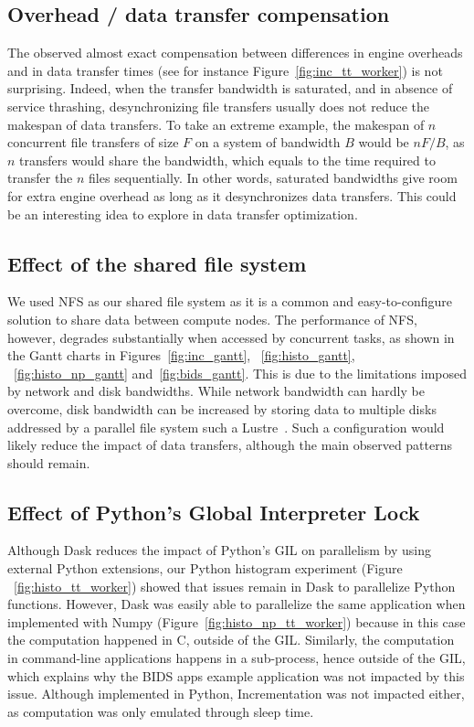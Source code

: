 \documentclass[conference]{IEEEtran}
\begin{document}
\subsection{Overhead / data transfer compensation}

The observed almost exact compensation between differences in engine
overheads and in data transfer times (see for instance
Figure~\ref{fig:inc_tt_worker}) is not surprising. Indeed, when the transfer
bandwidth is saturated, and in absence of service thrashing,
desynchronizing file transfers usually does not reduce the makespan of data
transfers. To take an extreme example, the makespan of $n$ concurrent file
transfers of size $F$ on a system of bandwidth $B$ would be $nF/B$, as $n$
transfers would share the bandwidth, which equals to the time required
to transfer the $n$ files sequentially. In other words, saturated bandwidths
give room for extra engine overhead as long as it desynchronizes data
transfers. This could be an interesting idea to explore in data transfer optimization.

\subsection{Effect of the shared file system}

We used NFS as our shared file system as it is a common and
easy-to-configure solution to share data between compute nodes. The
performance of NFS, however, degrades substantially when accessed by
concurrent tasks, as shown in the Gantt charts in
Figures~\ref{fig:inc_gantt}, ~\ref{fig:histo_gantt}, ~\ref{fig:histo_np_gantt} 
and~\ref{fig:bids_gantt}. This is due to the limitations imposed by network and disk
bandwidths. While network bandwidth can hardly be overcome, disk bandwidth
can be increased by storing data to multiple disks addressed by a parallel
file system such a Lustre~\cite{lustre}. Such a configuration would likely
reduce the impact of data transfers, although the main observed patterns
should remain. 

\subsection{Effect of Python's Global Interpreter Lock}

Although Dask reduces the impact of Python's GIL on parallelism by using external
Python extensions, our Python histogram experiment (Figure
~\ref{fig:histo_tt_worker}) showed that issues remain in Dask to
parallelize Python functions. However, Dask was easily able to parallelize
the same application when implemented with Numpy
(Figure~\ref{fig:histo_np_tt_worker}) because in this case the computation
happened in C, outside of the GIL. Similarly, the computation in
command-line applications happens in a sub-process, hence outside of the
GIL, which explains why the BIDS apps example application was not impacted
by this issue. Although implemented in Python, Incrementation was not
impacted either, as computation was only emulated through sleep time.
\end{document}
